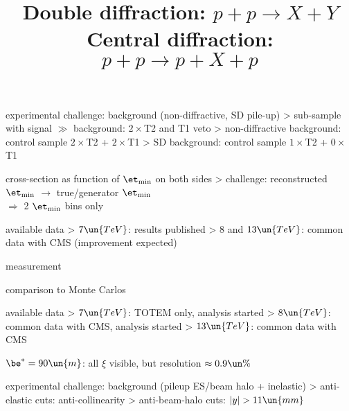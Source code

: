 \newpage %

\centerline{}

\newpage %
\title{Double diffraction: $p + p \rightarrow X + Y$}

\centerline{}

\> experimental challenge: background (non-diffractive, SD pile-up)
\>> sub-sample with signal $\gg$ background:  $2\times$T2 and T1 veto
\>> non-diffractive background: control sample $2\times$T2 + $2\times$T1
\>> SD background: control sample $1\times$T2 + $0\times$T1

\> cross-section as function of $\et_{\rm min}$ on both sides
\>> challenge: reconstructed $\et_{\rm min}$ $\longrightarrow$ true/generator $\et_{\rm min}$\\
$\Rightarrow$ 2 $\et_{\rm min}$ bins only

\> available data
\>> $7\un{TeV}$: results published
\>> $8$ and $13\un{TeV}$: common data with CMS (improvement expected)

\newpage %

\> measurement

\centerline{}

\> comparison to Monte Carlos

\centerline{}

\newpage %
\title{Central diffraction: $p + p \rightarrow p + X + p$}

\centerline{}

\> available data
\>> $7\un{TeV}$: TOTEM only, analysis started
\>> $8\un{TeV}$: common data with CMS, analysis started
\>> $13\un{TeV}$: common data with CMS

\> $\be^* = 90\un{m}$: all $\xi$ visible, but resolution $\approx 0.9\un{\%}$

\> experimental challenge: background (pileup ES/beam halo + inelastic)
\>> anti-elastic cuts: anti-collinearity
\>> anti-beam-halo cuts: $|y| > 11\un{mm}$

